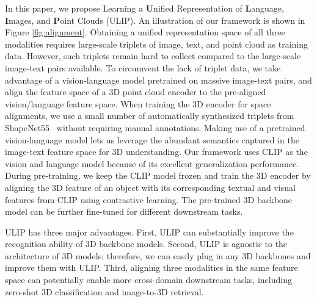 \documentclass[10pt,twocolumn,letterpaper]{article}
\begin{document}
In this paper, we propose Learning a \textbf{U}nified Representation of \textbf{L}anguage, \textbf{I}mages, and \textbf{P}oint Clouds (ULIP). 
An illustration of our framework is shown in Figure \ref{fig:alignment}. 
Obtaining a unified representation space of all three modalities requires large-scale triplets of image, text, and point cloud as training data.
However, such triplets remain hard to collect compared to the large-scale image-text pairs available.
To circumvent the lack of triplet data, we take advantage of a vision-language model pretrained on massive image-text pairs, and align the feature space of a 3D point cloud encoder to the pre-aligned vision/language feature space. 
When training the 3D encoder for space alignments, we use a small number of automatically synthesized triplets from ShapeNet55~\cite{chang2015shapenet} without requiring manual annotations.
Making use of a pretrained vision-language model lets us leverage the abundant semantics captured in the image-text feature space for 3D understanding.
Our framework uses CLIP as the vision and language model because of its excellent generalization performance. During pre-training, we keep the CLIP model frozen and train the 3D encoder by aligning the 3D feature of an object with its corresponding textual and visual features from CLIP using contrastive learning.
The pre-trained 3D backbone model can be further fine-tuned for different downstream tasks.



ULIP has three major advantages. First, ULIP can substantially improve the recognition ability of 3D backbone models. Second, ULIP is agnostic to the architecture of 3D models; therefore, we can easily plug in any 3D backbones and improve them with ULIP. Third, aligning three modalities in the same feature space can potentially enable more cross-domain downstream tasks, including zero-shot 3D classification and image-to-3D retrieval.
\end{document}
